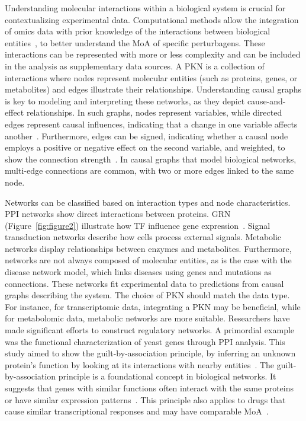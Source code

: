 Understanding molecular interactions within a biological system is crucial for contextualizing experimental data. 
Computational methods allow the integration of omics data with prior knowledge of the interactions between biological entities~\cite{RN38}, to better understand the \gls{MoA} of specific perturbagens.  
These interactions can be represented with more or less complexity and can be included in the analysis as supplementary data sources. 
A \gls{PKN} is a collection of interactions where nodes represent molecular entities (such as proteins, genes, or metabolites) and edges illustrate their relationships. 
Understanding causal graphs is key to modeling and interpreting these networks, as they depict cause-and-effect relationships. 
In such graphs, nodes represent variables, while directed edges represent causal influences, indicating that a change in one variable affects another~\cite{RN37}. 
Furthermore, edges can be signed, indicating whether a causal node employs a positive or negative effect on the second variable, and weighted, to show the connection strength~\cite{RN37}. 
In causal graphs that model biological networks, multi-edge connections are common, with two or more edges linked to the same node. 

Networks can be classified based on interaction types and node characteristics. \gls{PPI} networks show direct interactions between proteins. 
\gls{GRN} (Figure~\ref{fig:figure2}) illustrate how \gls{TF} influence gene expression~\cite{RN145}. 
Signal transduction networks describe how cells process external signals. Metabolic networks display relationships between enzymes and metabolites. 
Furthermore, networks are not always composed of molecular entities, as is the case with the disease network model, which links diseases using genes and mutations as connections. 
These networks fit experimental data to predictions from causal graphs describing the system. The choice of \gls{PKN} should match the data type. 
For instance, for transcriptomic data, integrating a \gls{PKN} may be beneficial, while for metabolomic data, metabolic networks are more suitable. 
Researchers have made significant efforts to construct regulatory networks. A primordial example was the functional characterization of yeast genes through \gls{PPI} analysis. This study aimed to show the guilt-by-association principle, by inferring an unknown protein's function by looking at its interactions with nearby entities~\cite{RN37, RN103}. 
The guilt-by-association principle is a foundational concept in biological networks. It suggests that genes with similar functions often interact with the same proteins or have similar expression patterns~\cite{RN133}. 
This principle also applies to drugs that cause similar transcriptional responses and may have comparable \gls{MoA}~\cite{RN64}.

